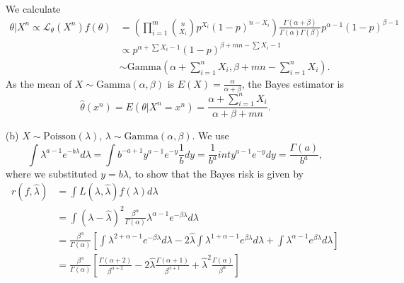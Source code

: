 \begin{itemize}
\begin{equation*}
    \end{equation*}
    We calculate
    \begin{equation*}
        \begin{split}
            \theta|X^n \propto \mathcal{L}_{\theta}(X^n) f(\theta)
                &= \left(\prod_{i = 1}^m \binom{n}{X_i} p^{X_i} (1 - p)^{n - X_i}\right) \frac{\Gamma(\alpha + \beta)}{\Gamma(\alpha)\Gamma(\beta)} p^{\alpha - 1}(1 - p)^{\beta - 1} \\
                &\propto p^{\alpha + \sum X_i - 1} (1 - p)^{\beta + mn - \sum X_i - 1} \\
                &\sim \mathrm{Gamma}\left(\alpha + \sum_{i = 1}^n X_i, \beta + mn - \sum_{i = 1}^n X_i\right).
        \end{split}
    \end{equation*}
    As the mean of $X \sim \mathrm{Gamma}(\alpha, \beta)$ is $E(X) = \frac{\alpha}{\alpha + \beta}$, the Bayes estimator is
    \begin{equation*}
        \hat{\theta}(x^n) = E(\theta|X^n = x^n) = \frac{\alpha + \sum_{i = 1}^n X_i}{\alpha + \beta + mn}.
    \end{equation*}
\item[(b)] $X \sim \mathrm{Poisson}(\lambda)$, $\lambda \sim \mathrm{Gamma}(\alpha, \beta)$.
    We use
    \begin{equation*}
        \int \lambda^{a - 1} e^{-b\lambda} d\lambda
            = \int b^{-a + 1} y^{a - 1} e^{-y} \frac{1}{b} dy
            = \frac{1}{b^a} int y^{a - 1} e^{-y} dy
            = \frac{\Gamma(a)}{b^a},
    \end{equation*}
    where we substituted $y = b\lambda$, to show that the Bayes risk is given by
    \begin{equation*}
        \begin{split}
            r(f, \hat{\lambda})
                &= \int L(\lambda, \hat{\lambda}) f(\lambda) d\lambda \\
                &= \int (\lambda - \hat{\lambda})^2 \frac{\beta^{\alpha}}{\Gamma(\alpha)} \lambda^{\alpha - 1} e^{-\beta \lambda} d\lambda \\
                &= \frac{\beta^{\alpha}}{\Gamma(\alpha)} \left[
                    \int \lambda^{2 + \alpha - 1} e^{-\beta \lambda} d\lambda - 2 \hat{\lambda} \int \lambda^{1 + \alpha - 1} e^{\beta \lambda} d\lambda + \int \lambda^{\alpha - 1} e^{\beta \lambda} d\lambda
                \right] \\
                &= \frac{\beta^{\alpha}}{\Gamma(\alpha)} \left[ \frac{\Gamma(\alpha + 2)}{\beta^{\alpha + 2}} - 2 \hat{\lambda} \frac{\Gamma(\alpha + 1)}{\beta^{\alpha + 1}} + \hat{\lambda}^2 \frac{\Gamma(\alpha)}{\beta^{\alpha}} \right] \\

\end{split}
\end{equation*}
\end{itemize}
